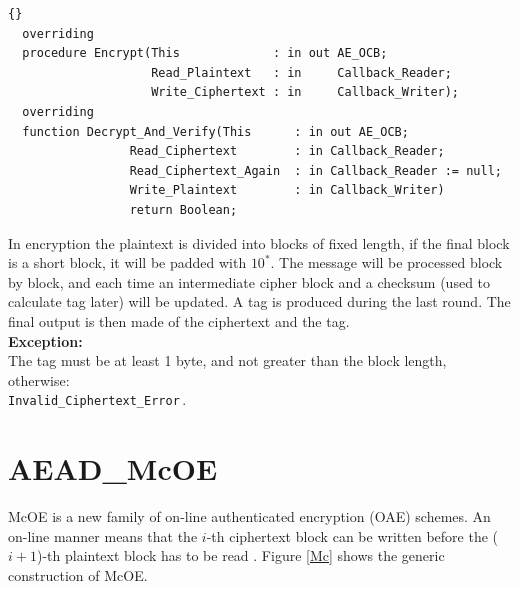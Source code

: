 \hhline
\begin{lstlisting}{}
  overriding
  procedure Encrypt(This             : in out AE_OCB;
                    Read_Plaintext   : in     Callback_Reader;
                    Write_Ciphertext : in     Callback_Writer);
  overriding
  function Decrypt_And_Verify(This      : in out AE_OCB;
                 Read_Ciphertext        : in Callback_Reader;
                 Read_Ciphertext_Again  : in Callback_Reader := null;
                 Write_Plaintext        : in Callback_Writer)
                 return Boolean;
\end{lstlisting}
In encryption the plaintext is divided into blocks of fixed length, if
the final block is a short block, it will be padded with $10^*$. The
message will be processed block by block, and each time an
intermediate cipher block and a checksum (used to calculate tag later)
will be updated. A tag is produced during the last round. The final
output is then made of the ciphertext and the tag.\\

\noindent\textbf{Exception:}\\ The tag must be at least 1 byte, and
not greater than the block length,
otherwise:\\ \texttt{Invalid\_Ciphertext\_Error}\,.


\section{AEAD\_McOE}
McOE is a new family of on-line authenticated encryption (OAE)
schemes. An on-line manner means that the $i$-th ciphertext block can
be written before the ($i+1$)-th plaintext block has to be read
\cite{DBLP:conf/fse/FleischmannFL12}. Figure \ref{Mc} shows the
generic construction of McOE.

